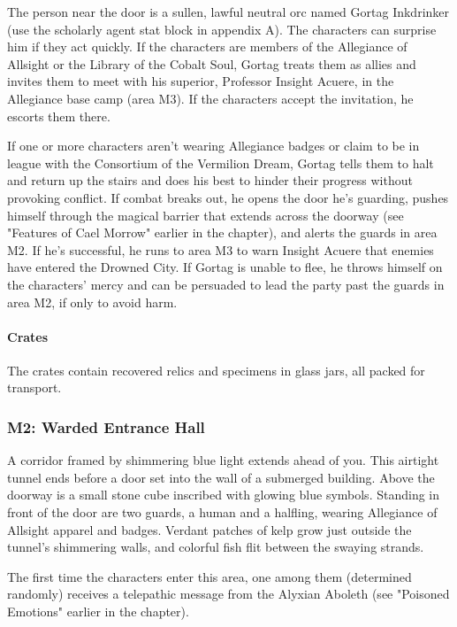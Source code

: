 \documentclass[10pt,a4paper,twoside,bg=print,twocolumn,openany,nodeprecatedcode]{dndbook}
\begin{document}
The person near the door is a sullen, lawful neutral orc named Gortag Inkdrinker (use the scholarly agent stat block in appendix A). The characters can surprise him if they act quickly. If the characters are members of the Allegiance of Allsight or the Library of the Cobalt Soul, Gortag treats them as allies and invites them to meet with his superior, Professor Insight Acuere, in the Allegiance base camp (area M3). If the characters accept the invitation, he escorts them there.

If one or more characters aren't wearing Allegiance badges or claim to be in league with the Consortium of the Vermilion Dream, Gortag tells them to halt and return up the stairs and does his best to hinder their progress without provoking conflict. If combat breaks out, he opens the door he's guarding, pushes himself through the magical barrier that extends across the doorway (see "Features of Cael Morrow" earlier in the chapter), and alerts the guards in area M2. If he's successful, he runs to area M3 to warn Insight Acuere that enemies have entered the Drowned City. If Gortag is unable to flee, he throws himself on the characters' mercy and can be persuaded to lead the party past the guards in area M2, if only to avoid harm.

\paragraph{Crates}
The crates contain recovered relics and specimens in glass jars, all packed for transport.

\subsubsection{M2: Warded Entrance Hall}
\begin{DndReadAloud}{}
A corridor framed by shimmering blue light extends ahead of you. This airtight tunnel ends before a door set into the wall of a submerged building. Above the doorway is a small stone cube inscribed with glowing blue symbols. Standing in front of the door are two guards, a human and a halfling, wearing Allegiance of Allsight apparel and badges. Verdant patches of kelp grow just outside the tunnel's shimmering walls, and colorful fish flit between the swaying strands.

\end{DndReadAloud}

The first time the characters enter this area, one among them (determined randomly) receives a telepathic message from the Alyxian Aboleth (see "Poisoned Emotions" earlier in the chapter).
\end{document}
